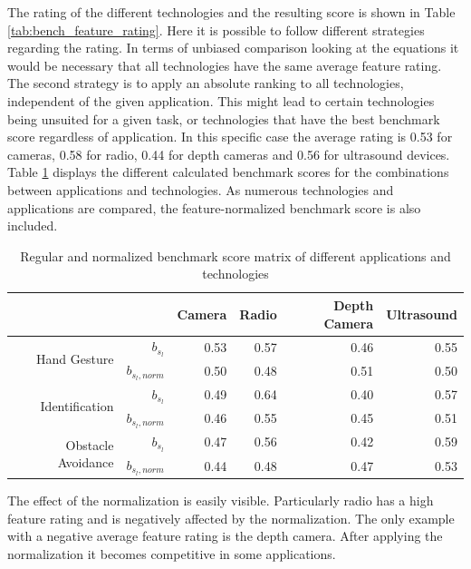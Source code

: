 The rating of the different technologies and the resulting score is shown in Table \ref{tab:bench_feature_rating}. Here it is possible to follow different strategies regarding the rating. In terms of unbiased comparison looking at the equations it would be necessary that all technologies have the same average feature rating. The second strategy is to apply an absolute ranking to all technologies, independent of the given application. This might lead to certain technologies being unsuited for a given task, or technologies that have the best benchmark score regardless of application. In this specific case the average rating is 0.53 for cameras, 0.58 for radio, 0.44 for depth cameras and 0.56 for ultrasound devices. Table \ref{tab:bench_scores} displays the different calculated benchmark scores for the combinations between applications and technologies. As numerous technologies and applications are compared, the feature-normalized benchmark score is also included.

\begin{table}[htbp]
  \centering
  \caption{Regular and normalized benchmark score matrix of different applications and technologies}
    \begin{tabular}{rrrrrr}
    \toprule
          &       & Camera & Radio & Depth Camera & Ultrasound \\
    \midrule
    \multirow{2}[0]{*}{Hand Gesture} & $b_{s_l}$ & 0.53  & 0.57  & 0.46  & 0.55 \\
          & $b_{s_l,norm}$ & 0.50  & 0.48  & 0.51  & 0.50 \\
          \midrule
    \multirow{2}[0]{*}{Identification} & $b_{s_l}$ & 0.49  & 0.64  & 0.40  & 0.57 \\
          & $b_{s_l,norm}$ & 0.46  & 0.55  & 0.45  & 0.51 \\
          \midrule
    \multirow{2}[0]{*}{Obstacle Avoidance} & $b_{s_l}$ & 0.47  & 0.56  & 0.42  & 0.59 \\
          & $b_{s_l,norm}$ & 0.44  & 0.48  & 0.47  & 0.53 \\
    \bottomrule
    \end{tabular}%
  \label{tab:bench_scores}%
\end{table}%
The effect of the normalization is easily visible. Particularly radio has a high feature rating and is negatively affected by the normalization. The only example with a negative average feature rating is the depth camera. After applying the normalization it becomes competitive in some applications.

